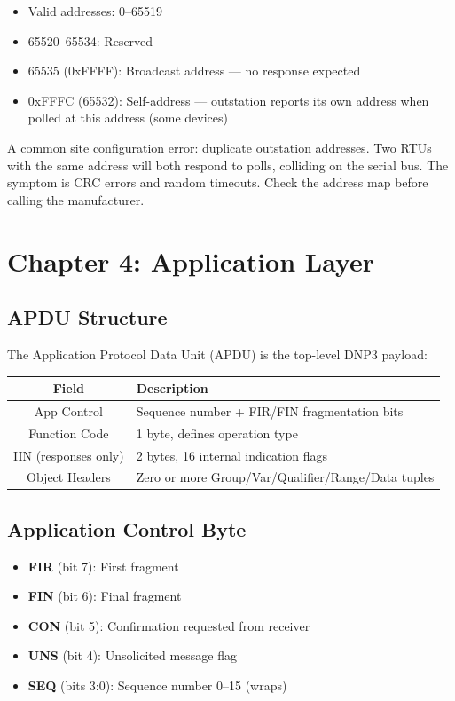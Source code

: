 \documentclass[11pt,twoside]{article}
\begin{document}
\begin{itemize}[noitemsep]
  \item Valid addresses: 0--65519
  \item 65520--65534: Reserved
  \item 65535 (0xFFFF): Broadcast address --- no response expected
  \item 0xFFFC (65532): Self-address --- outstation reports its own address when polled at this address (some devices)
\end{itemize}

A common site configuration error: duplicate outstation addresses. Two RTUs with the same address will both respond to polls, colliding on the serial bus. The symptom is CRC errors and random timeouts. Check the address map before calling the manufacturer.

\section{Chapter 4: Application Layer}

\subsection{APDU Structure}

The Application Protocol Data Unit (APDU) is the top-level DNP3 payload:

\begin{center}
\begin{tabularx}{0.8\textwidth}{|c|X|}
\hline
\textbf{Field} & \textbf{Description} \\
\hline
App Control & Sequence number + FIR/FIN fragmentation bits \\
Function Code & 1 byte, defines operation type \\
IIN (responses only) & 2 bytes, 16 internal indication flags \\
Object Headers & Zero or more Group/Var/Qualifier/Range/Data tuples \\
\hline
\end{tabularx}
\end{center}

\subsection{Application Control Byte}

\begin{itemize}[noitemsep]
  \item \textbf{FIR} (bit 7): First fragment
  \item \textbf{FIN} (bit 6): Final fragment
  \item \textbf{CON} (bit 5): Confirmation requested from receiver
  \item \textbf{UNS} (bit 4): Unsolicited message flag
  \item \textbf{SEQ} (bits 3:0): Sequence number 0--15 (wraps)
\end{itemize}
\end{document}
